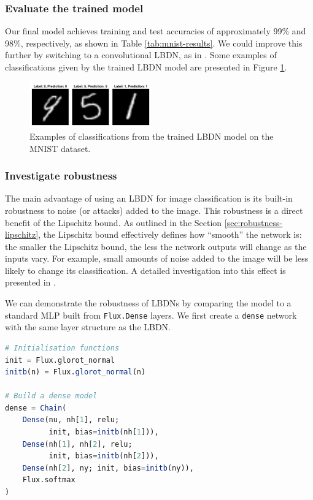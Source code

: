 \subsubsection{Evaluate the trained model} \label{sec:mnist-evaluate}

Our final model achieves training and test accuracies of approximately 99\% and 98\%, respectively, as shown in Table \ref{tab:mnist-results}. We could improve this further by switching to a convolutional LBDN, as in \cite{Wang+Manchester2023}. Some examples of classifications given by the trained LBDN model are presented in Figure \ref{fig:mnist_numbers}.

\begin{figure}[!t]
    \centering
    \includegraphics[width=0.47\textwidth]{Images/lbdn_mnist.pdf}
    \caption{Examples of classifications from the trained LBDN model on the MNIST dataset.}
    \label{fig:mnist_numbers}
\end{figure}

\subsubsection{Investigate robustness} \label{sec:mnist-robustness}

The main advantage of using an LBDN for image classification is its built-in robustness to noise (or attacks) added to the image. This robustness is a direct benefit of the Lipschitz bound. As outlined in the Section \ref{sec:robustness-lipschitz}, the Lipschitz bound effectively defines how ``smooth'' the network is: the smaller the Lipschitz bound, the less the network outputs will change as the inputs vary. For example, small amounts of noise added to the image will be less likely to change its classification. A detailed investigation into this effect is presented in \cite{Wang+Manchester2023}.

We can demonstrate the robustness of LBDNs by comparing the model to a standard MLP built from \verb|Flux.Dense| layers. We first create a \verb|dense| network with the same layer structure as the LBDN.
\begin{lstlisting}[language = Julia]
# Initialisation functions
init = Flux.glorot_normal
initb(n) = Flux.glorot_normal(n)

# Build a dense model
dense = Chain(
    Dense(nu, nh[1], relu; 
          init, bias=initb(nh[1])),
    Dense(nh[1], nh[2], relu; 
          init, bias=initb(nh[2])),
    Dense(nh[2], ny; init, bias=initb(ny)),
    Flux.softmax
)
\end{lstlisting}


